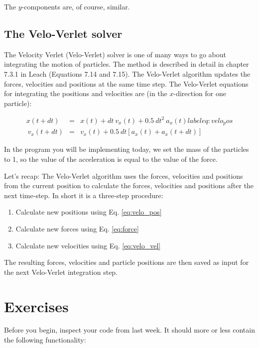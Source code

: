 \documentclass{article}
\begin{document}
The $y$-components are, of course, similar.

\subsection{The Velo-Verlet solver}

The Velocity Verlet (Velo-Verlet) solver is one of many ways to go about
integrating the motion of particles. The method is described in detail in
chapter 7.3.1 in Leach (Equations 7.14 and 7.15). The Velo-Verlet algorithm
updates the forces, velocities and positions at the same time step. The
Velo-Verlet equations for integrating the positions and velocities are (in the
$x$-direction for one particle):

\begin{eqnarray}
x(t + dt) &=& x(t) + dt\ v_x(t) + 0.5\ dt^2\ a_x(t)label{eq:velo_pos} \\\
v_x(t + dt) &=& v_x(t) + 0.5\ dt \left[a_x(t) + a_x(t+dt)\right] \label{eq:velo_vel}
\end{eqnarray}

In the program you will be implementing today, we set the mass of the particles
to 1, so the value of the acceleration is equal to the value of the
force.

Let's recap: The Velo-Verlet algorithm uses the forces,
velocities and positions from the current position to calculate the forces,
velocities and positions after the next time-step. In short it is a three-step
procedure:

\begin{enumerate}
    \item Calculate new positions using Eq. \ref{eq:velo_pos}
    \item Calculate new forces using Eq. \ref{eq:force}
    \item Calculate new velocities using Eq. \ref{eq:velo_vel}
\end{enumerate}

The resulting forces, velocities and particle positions are then saved as input
for the next Velo-Verlet integration step.


\newpage
\clearpage
\section{Exercises}

Before you begin, inspect your code from last week. It should more or less
contain the following functionality:

\end{document}
